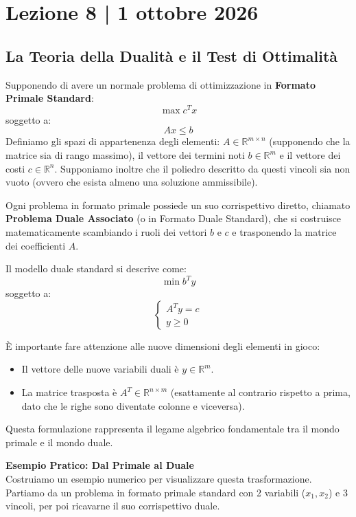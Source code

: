 \documentclass[12pt, a4paper]{article}
\begin{document}
	\section*{Lezione 8 | 1 ottobre 2026}
	\subsection*{La Teoria della Dualità e il Test di Ottimalità}
	
	Supponendo di avere un normale problema di ottimizzazione in \textbf{Formato Primale Standard}:
	\[
	\max c^T x
	\]
	soggetto a:
	\[
	Ax \leq b
	\]
	Definiamo gli spazi di appartenenza degli elementi: $A \in \mathbb{R}^{m \times n}$ (supponendo che la matrice sia di rango massimo), il vettore dei termini noti $b \in \mathbb{R}^m$ e il vettore dei costi $c \in \mathbb{R}^n$. Supponiamo inoltre che il poliedro descritto da questi vincoli sia non vuoto (ovvero che esista almeno una soluzione ammissibile).
	
	Ogni problema in formato primale possiede un suo corrispettivo diretto, chiamato \textbf{Problema Duale Associato} (o in Formato Duale Standard), che si costruisce matematicamente scambiando i ruoli dei vettori $b$ e $c$ e trasponendo la matrice dei coefficienti $A$. 
	
	Il modello duale standard si descrive come:
	\[
	\min b^T y
	\]
	soggetto a:
	\[
	\begin{cases}
		A^T y = c \\
		y \geq 0
	\end{cases}
	\]
	
	È importante fare attenzione alle nuove dimensioni degli elementi in gioco:
	\begin{itemize}[label=\textcolor{titlecolor}{\Large\textbullet}, itemsep=2pt, leftmargin=1.5cm]
		\item Il vettore delle nuove variabili duali è $y \in \mathbb{R}^m$.
		\item La matrice trasposta è $A^T \in \mathbb{R}^{n \times m}$ (esattamente al contrario rispetto a prima, dato che le righe sono diventate colonne e viceversa).
	\end{itemize}
	
	Questa formulazione rappresenta il legame algebrico fondamentale tra il mondo primale e il mondo duale.
	
	\vspace{0.6cm}
	\textbf{Esempio Pratico: Dal Primale al Duale}\\
	Costruiamo un esempio numerico per visualizzare questa trasformazione. Partiamo da un problema in formato primale standard con 2 variabili ($x_1, x_2$) e 3 vincoli, per poi ricavarne il suo corrispettivo duale.
	
\end{document}
